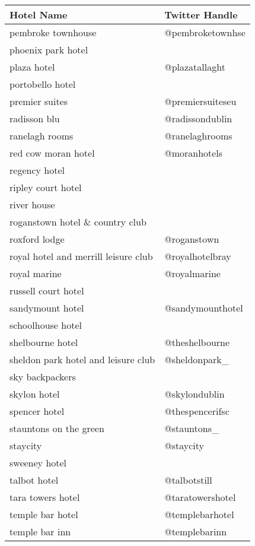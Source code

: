 \begin{table}[h!]
\begin{tabular}{|p{7cm}|p{5cm}|}
\hline
\textbf{Hotel Name} & \textbf{Twitter Handle} \\ \hline
pembroke townhouse & @pembroketownhse \\ \hline
phoenix park hotel &  \\ \hline
plaza hotel & @plazatallaght \\ \hline
portobello hotel &  \\ \hline
premier suites & @premiersuiteseu \\ \hline
radisson blu & @radissondublin \\ \hline
ranelagh rooms & @ranelaghrooms \\ \hline
red cow moran hotel & @moranhotels \\ \hline
regency hotel &  \\ \hline
ripley court hotel &  \\ \hline
river house &  \\ \hline
roganstown hotel \& country club &  \\ \hline
roxford lodge & @roganstown \\ \hline
royal hotel and merrill leisure club & @royalhotelbray \\ \hline
royal marine & @royalmarine \\ \hline
russell court hotel &  \\ \hline
sandymount hotel & @sandymounthotel \\ \hline
schoolhouse hotel &  \\ \hline
shelbourne hotel & @theshelbourne \\ \hline
sheldon park hotel and leisure club & @sheldonpark\_ \\ \hline
sky backpackers &  \\ \hline
skylon hotel & @skylondublin \\ \hline
spencer hotel & @thespencerifsc \\ \hline
stauntons on the green & @stauntons\_ \\ \hline
staycity & @staycity \\ \hline
sweeney hotel &  \\ \hline
talbot hotel & @talbotstill \\ \hline
tara towers hotel & @taratowershotel \\ \hline
temple bar hotel & @templebarhotel \\ \hline
temple bar inn & @templebarinn \\ \hline

\end{tabular}
\end{table}
